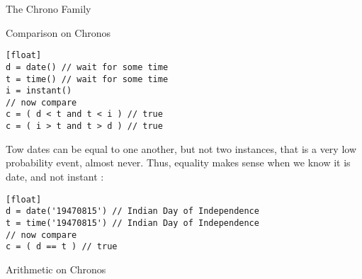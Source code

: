\begin{section}{The Chrono Family}
\begin{subsection}{Comparison on Chronos}
\begin{lstlisting}[style=JexlStyle][float]
d = date() // wait for some time 
t = time() // wait for some time 
i = instant()
// now compare 
c = ( d < t and t < i ) // true 
c = ( i > t and t > d ) // true 
\end{lstlisting}

Tow dates can be equal to one another, but not two instances,
that is a very low probability event, almost never.
Thus, equality makes sense when we know it is date, and not instant :

\begin{lstlisting}[style=JexlStyle][float]
d = date('19470815') // Indian Day of Independence  
t = time('19470815') // Indian Day of Independence  
// now compare 
c = ( d == t ) // true 
\end{lstlisting}

\end{subsection}

\begin{subsection}{Arithmetic on Chronos}

\end{subsection}


\end{section}


